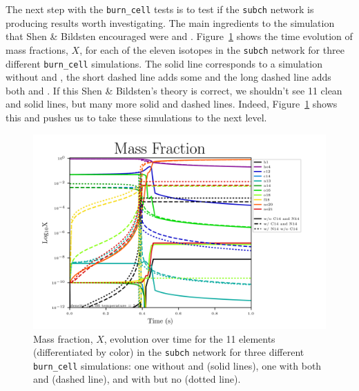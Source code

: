 \documentclass[11pt, oneside]{article}   	%
\begin{document}
      The next step with the {\tt burn\_cell} tests is to test if the {\tt subch} network is producing results worth investigating. The main ingredients to the simulation that Shen \& Bildsten encouraged were  and . %
      Figure~\ref{fig:microphysicsX} shows the time evolution of mass fractions, $X$, for each of the eleven isotopes in the {\tt subch} network for three different {\tt burn\_cell} simulations. The solid line corresponds to a simulation without  and , the short dashed line adds some  and the long dashed line adds both  and . If this Shen \& Bildsten's theory is correct, we shouldn't see 11 clean and solid lines, but many more solid and dashed lines. Indeed, Figure~\ref{fig:microphysicsX} shows this and pushes us to take these simulations to the next level.
      
      
      \begin{figure}
        \centering
        \includegraphics[width=5in]{images/subch_nC14nN14_xn_tol-10.png}
        \caption{Mass fraction, $X$, evolution over time for the 11 elements (differentiated by color) in the {\tt subch} network for three different {\tt burn\_cell} simulations: one without  and  (solid lines), one with both  and  (dashed line), and with  but no  (dotted line). %
          }
        \label{fig:microphysicsX}
      \end{figure} 
      
\end{document}
